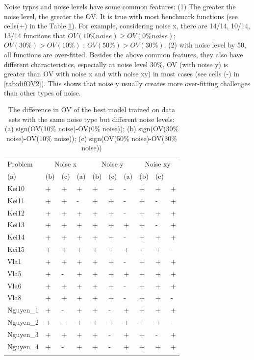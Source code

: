 Noise types and noise levels have some common features: (1) The greater the noise level, the greater the OV. It is true with most benchmark functions (see cells(+) in the Table \ref{tab:difOV1}). For example, considering noise x, there are 14/14, 10/14, 13/14 functions that $OV (10\% noise) \ge OV (0\% noise)$; $OV(30\%) > OV(10\%)$ ; $OV(50\%) > OV(30\%)$. (2) with noise level by 50, all functions are over-fitted. Besides the above common features, they also have different characteristics, especially at noise level 30\%, OV (with noise y) is greater than OV with noise x and with noise xy) in most cases (see cells (-) in \ref{tab:difOV2}). This shows that noise y usually creates more over-fitting challenges than other types of noise.\par

\begin{table}
\caption{The difference in OV of the best model trained on data sets with the same noise type but different noise levels: (a) sign(OV(10\% noise)-OV(0\% noise)); (b) sign(OV(30\% noise)-OV(10\% noise)); (c) sign(OV(50\% noise)-OV(30\% noise)) }
\label{tab:difOV1}       %
\begin{tabular}{l|lll|lll|lll}
\hline\noalign{\smallskip}
Problem &\multicolumn{3}{|c|}{Noise x} & \multicolumn{3}{c|}{Noise y} & \multicolumn{3}{c}{Noise xy} \\
(a) & (b) & (c) & (a) & (b) & (c) & (a) & (b) & (c)\\
\noalign{\smallskip}\hline\noalign{\smallskip}
Kei10 & + & + & + & + & + & - & + & + & + \\
Kei11 & + & + & - & + & + & - & + & - & + \\
Kei12 & + & + & + & + & + & - & + & + & + \\
Kei13 & + & + & + & + & + & + & + & - & + \\
Kei14 & + & + & + & + & + & - & + & + & + \\
Kei15 & + & + & + & + & + & + & + & + & - \\
Vla1 & + & + & + & + & + & - & + & + & + \\
Vla5 & + & - & + & + & + & + & + & + & + \\
Vla6 & + & + & + & + & + & - & + & + & + \\
Vla8 & + & + & + & + & + & - & + & + & - \\
Nguyen\_1 & + & - & + & + & - & + & + & + & + \\
Nguyen\_2 & + & - & + & + & + & + & + & + & - \\
Nguyen\_3 & + & + & + & + & - & + & + & - & + \\
Nguyen\_4 & + & - & + & + & - & + & + & + & + \\
\noalign{\smallskip}\hline
\end{tabular}
\end{table}


